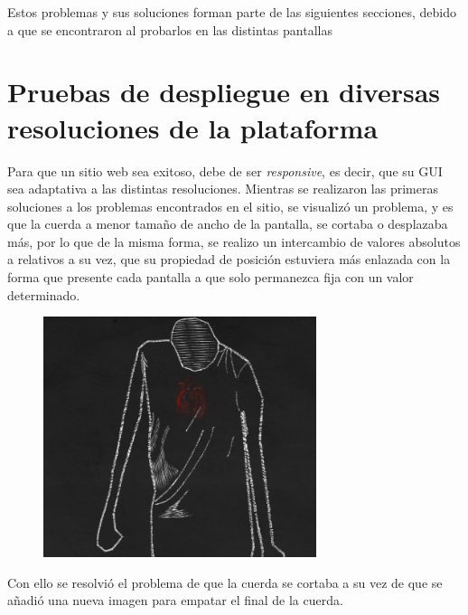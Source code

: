 \documentclass[11pt,DIV=9, letterpaper, oneside, openright]{scrartcl}
\begin{document}
 Estos problemas y sus soluciones forman parte de las siguientes secciones, debido a que se encontraron al probarlos en las distintas pantallas
 
 \section{Pruebas de despliegue en diversas resoluciones de la plataforma}
 
 Para que un sitio web sea exitoso, debe de ser \emph{responsive}, es decir, que su GUI sea adaptativa a las distintas resoluciones. Mientras se realizaron las primeras soluciones a los problemas encontrados en el sitio, se visualizó un problema, y es que la cuerda a menor tamaño de ancho de la pantalla, se cortaba o desplazaba más, por lo que de la misma forma, se realizo un intercambio de valores absolutos a relativos a su vez, que su propiedad de posición estuviera más enlazada con la forma que presente cada pantalla a que solo permanezca fija con un valor determinado.
 \begin{figure}[h]
 \centering
 \includegraphics[width=8cm]{body.png}
 \end{figure}

 Con ello se resolvió el problema de que la cuerda se cortaba a su vez de que se añadió una nueva imagen para empatar el final de la cuerda.
 
\end{document}
